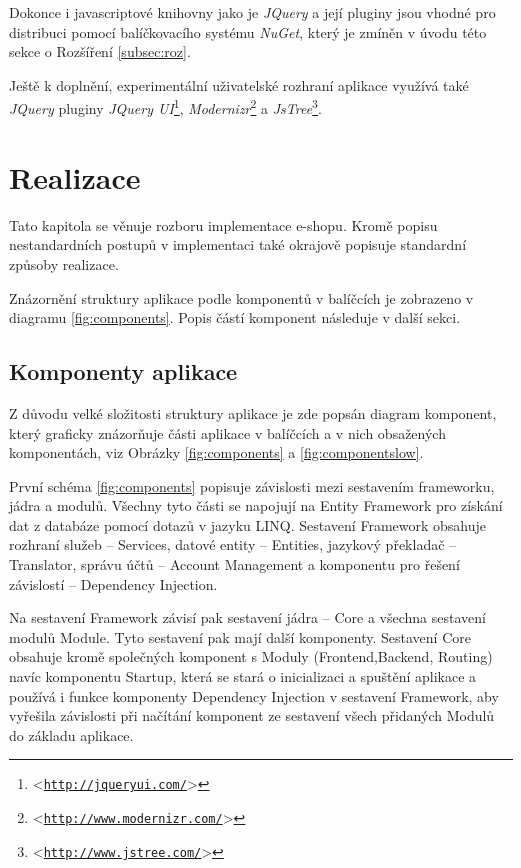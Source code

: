 \documentclass[11pt,twoside,a4paper]{book}
\let\oldUrl\url
\renewcommand\url[1]{<\texttt{\oldUrl{#1}}>}
\begin{document}
Dokonce i javascriptové knihovny jako je \textit{JQuery} a její pluginy jsou vhodné pro distribuci pomocí balíčkovacího systému \textit{NuGet}, který je zmíněn v úvodu této sekce o Rozšíření \ref{subsec:roz}.

Ještě k doplnění, experimentální uživatelské rozhraní aplikace využívá také \textit{JQuery} pluginy \textit{JQuery UI}\footnote{\url{http://jqueryui.com/}}, \textit{Modernizr}\footnote{\url{http://www.modernizr.com/}} a \textit{JsTree}\footnote{\url{http://www.jstree.com/}}.




\chapter{Realizace}
\label{sec:realizace}

Tato kapitola se věnuje rozboru implementace e-shopu. Kromě popisu nestandardních postupů v implementaci také okrajově popisuje standardní způsoby realizace.

Znázornění struktury aplikace podle komponentů v balíčcích je zobrazeno v diagramu \ref{fig:components}. Popis částí komponent následuje v další sekci.

\section{Komponenty aplikace}
Z důvodu velké složitosti struktury aplikace je zde popsán diagram komponent, který graficky znázorňuje části aplikace v balíčcích a v nich obsažených komponentách, viz Obrázky \ref{fig:components} a \ref{fig:componentslow}.

První schéma \ref{fig:components} popisuje závislosti mezi sestavením frameworku, jádra a modulů. Všechny tyto části se napojují na Entity Framework pro získání dat z databáze pomocí dotazů v jazyku LINQ. Sestavení \textsf{Framework} obsahuje rozhraní služeb -- \textsf{Services}, datové entity -- \textsf{Entities}, jazykový překladač -- \textsf{Translator}, správu účtů -- \textsf{Account Management} a komponentu pro řešení závislostí -- \textsf{Dependency Injection}.

Na sestavení \textsf{Framework} závisí pak sestavení jádra -- \textsf{Core} a všechna sestavení modulů \textsf{Module}. Tyto sestavení pak mají další komponenty. Sestavení \textsf{Core} obsahuje kromě společných komponent s \textsf{Modul}y (\textsf{Frontend},\textsf{Backend}, \textsf{Routing}) navíc komponentu \textsf{Startup}, která se stará o inicializaci a spuštění aplikace a používá i funkce komponenty \textsf{Dependency Injection} v sestavení \textsf{Framework}, aby vyřešila závislosti při načítání komponent ze sestavení všech přidaných \textsf{Modulů} do základu aplikace.
\end{document}

